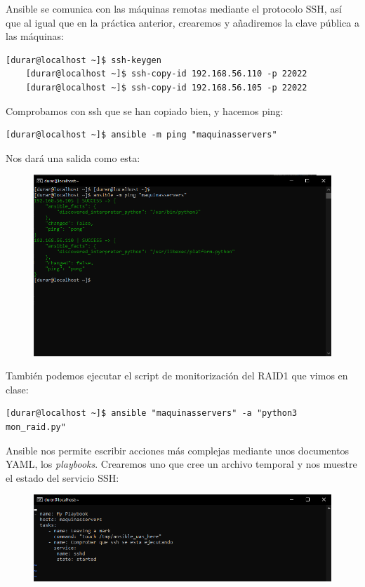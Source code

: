 \documentclass[a4paper]{article}
\begin{document}
Ansible se comunica con las máquinas remotas mediante el protocolo SSH, así que al igual que en la 
práctica anterior, crearemos y añadiremos la clave pública a las máquinas:
\begin{lstlisting}[style=bashCentOS]
    [durar@localhost ~]$ ssh-keygen
    [durar@localhost ~]$ ssh-copy-id 192.168.56.110 -p 22022
    [durar@localhost ~]$ ssh-copy-id 192.168.56.105 -p 22022
\end{lstlisting}
Comprobamos con ssh que se han copiado bien, y hacemos ping:
\begin{lstlisting}[style=bashCentOS]
    [durar@localhost ~]$ ansible -m ping "maquinasservers"
\end{lstlisting}
Nos dará una salida como esta:
\begin{figure}[hbt!]
    \centering
    \includegraphics[width=\textwidth]{salida de ansible ping.png}
\end{figure}
\newline También podemos ejecutar el script de monitorización del RAID1 que vimos en clase:
\begin{lstlisting}[style=bashCentOS]
    [durar@localhost ~]$ ansible "maquinasservers" -a "python3 mon_raid.py"
\end{lstlisting}
Ansible nos permite escribir acciones más complejas mediante unos documentos YAML, los \textsl{playbooks}.
Crearemos uno que cree un archivo temporal y nos muestre el estado del servicio SSH:
\begin{figure}[hbt!]
    \centering
    \includegraphics[width=\textwidth]{mi playbook.png}
\end{figure}
\end{document}
